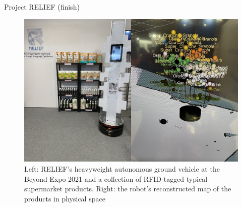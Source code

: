 \begin{frame}{Project RELIEF (finish)}

\begin{figure}[H]\centering
  \includegraphics[scale=0.25]{figures/05/relief_1.png}
  \caption{Left: RELIEF's heavyweight autonomous ground vehicle at the
           Beyond Expo 2021 and a collection of RFID-tagged typical supermarket
           products. Right: the robot's reconstructed map of
           the products in physical space}
  \label{fig:relief_beyond_1}
\end{figure}

\end{frame}
